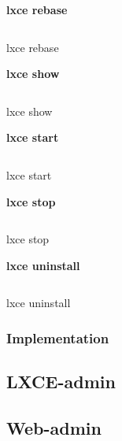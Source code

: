 \textbf{lxce rebase}
\begin{listing}[H]
\begin{verbatim}
\end{verbatim}
\caption{lxce rebase}
\label{listings: lxce rebase}
\end{listing}

\textbf{lxce show}
\begin{listing}[H]
\begin{verbatim}
\end{verbatim}
\caption{lxce show}
\label{listings: lxce show}
\end{listing}

\textbf{lxce start}
\begin{listing}[H]
\begin{verbatim}
\end{verbatim}
\caption{lxce start}
\label{listings: lxce start}
\end{listing}

\textbf{lxce stop}
\begin{listing}[H]
\begin{verbatim}
\end{verbatim}
\caption{lxce stop}
\label{listings: lxce stop}
\end{listing}

\textbf{lxce uninstall}
\begin{listing}[H]
\begin{verbatim}
\end{verbatim}
\caption{lxce uninstall}
\label{listings: lxce uninstall}
\end{listing}

\subsubsection{Implementation}
 

\subsection{LXCE-admin}


\subsection{Web-admin}
